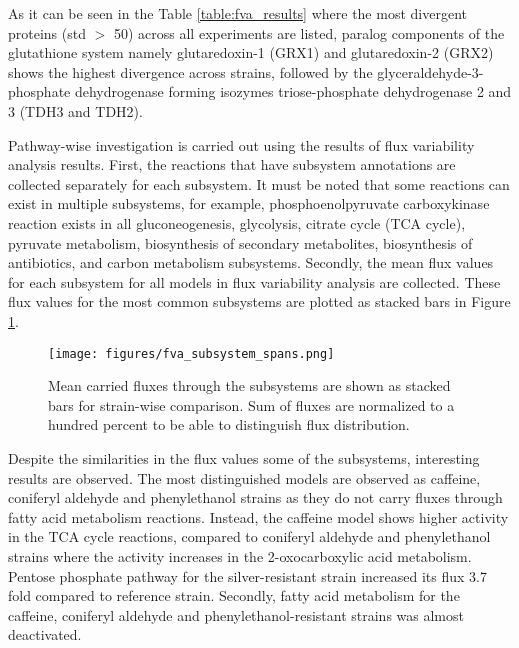   \vspace{-1cm}

As it can be seen in the Table \ref{table:fva_results} where the most divergent proteins (std $>$ 50) across all experiments are listed, paralog components of the glutathione system namely glutaredoxin-1 (GRX1) and glutaredoxin-2 (GRX2) shows the highest divergence across strains, followed by the glyceraldehyde-3-phosphate dehydrogenase forming isozymes triose-phosphate dehydrogenase 2 and 3 (TDH3 and TDH2).



\vspace{-1cm}

Pathway-wise investigation is carried out using the results of flux variability analysis results. First, the reactions that have subsystem annotations are collected separately for each subsystem. It must be noted that some reactions can exist in multiple subsystems, for example, phosphoenolpyruvate carboxykinase reaction exists in all gluconeogenesis, glycolysis, citrate cycle (TCA cycle), pyruvate metabolism, biosynthesis of secondary metabolites, biosynthesis of antibiotics, and carbon metabolism subsystems. Secondly, the mean flux values for each subsystem for all models in flux variability analysis are collected. These flux values for the most common subsystems are plotted as stacked bars in Figure \ref{fig:fva_subsystem_spans}.

\vspace{0.2cm}

\begin{figure}[H]
  \begin{center}
  \texttt{[image: figures/fva\_subsystem\_spans.png]}
  \caption[Mean carried fluxes through the subsystems are shown as stacked bars for strain-wise comparison. Sum of fluxes are normalized to a hundred percent to be able to distinguish flux distribution]{Mean carried fluxes through the subsystems are shown as stacked bars for strain-wise comparison. Sum of fluxes are normalized to a hundred percent to be able to distinguish flux distribution.}
  \label{fig:fva_subsystem_spans}
  \end{center}
\end{figure}

\vspace{-1cm}

Despite the similarities in the flux values some of the subsystems, interesting results are observed. The most distinguished models are observed as caffeine, coniferyl aldehyde and phenylethanol strains as they do not carry fluxes through fatty acid metabolism reactions. Instead, the caffeine model shows higher activity in the TCA cycle reactions, compared to coniferyl aldehyde and phenylethanol strains where the activity increases in the 2-oxocarboxylic acid metabolism. Pentose phosphate pathway for the silver-resistant strain increased its flux 3.7 fold compared to reference strain. Secondly, fatty acid metabolism for the caffeine, coniferyl aldehyde and phenylethanol-resistant strains was almost deactivated.

